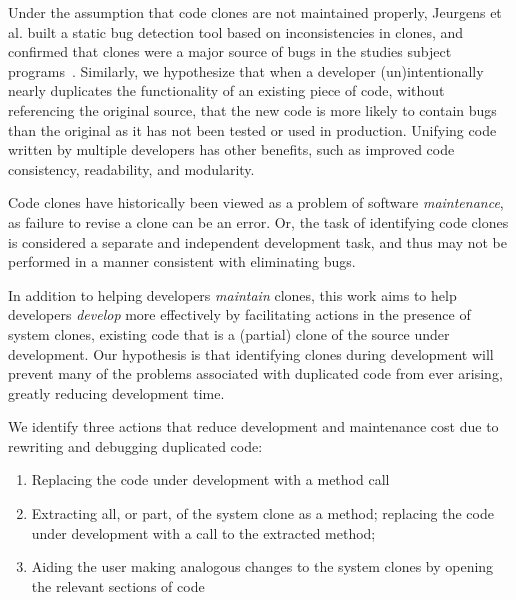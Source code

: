 \documentclass[preprint,10pt]{sigplanconf}
\begin{document}

Under the assumption that code clones are not maintained properly,
Jeurgens et al. built a static bug detection tool based on
inconsistencies in clones, and confirmed that clones were a major
source of bugs in the studies subject programs~\cite{Juergens2009}.
Similarly, we hypothesize that when a developer (un)intentionally
nearly duplicates the functionality of an existing piece of code, without
referencing the original source, that the new code is more likely to
contain bugs than the original as it has not been tested or used in
production. Unifying code written by multiple developers has other 
benefits, such as improved code consistency, readability, and modularity.

Code clones have historically been viewed as a problem of software
\emph{maintenance}, as failure to revise a clone can be an error. 
Or, the task of identifying code clones is considered a separate and
independent development task, and thus may not be performed in a
manner consistent with eliminating bugs.

In addition to helping developers \emph{maintain} clones, this work
aims to help developers \emph{develop} more effectively by
facilitating actions in the presence of system clones, existing code
that is a (partial) clone of the source under development.  Our hypothesis
 is that identifying clones during development will prevent many of the problems
associated with duplicated code from ever arising, greatly reducing development time.

We identify three actions that
reduce development and maintenance cost due to rewriting and
debugging duplicated code:

\begin{enumerate}
  \item Replacing the code under development with a method call
  \item Extracting all, or part, of the system clone as a method;
    replacing the code under development with a call to the extracted
    method;
  \item Aiding the user making analogous changes to the system clones
    by opening the relevant sections of code 
\end{enumerate}
\end{document}
